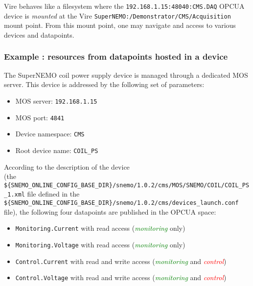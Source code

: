 \noindent Vire      behaves      like      a      filesystem      where      the
\texttt{192.168.1.15:48040:CMS.DAQ}  OPCUA device  is \emph{mounted}
at the Vire  \verb|SuperNEMO:/Demonstrator/CMS/Acquisition| mount point. From
this mount point,  one may navigate and access to  various devices and
datapoints.


\subsubsection{Example : resources from datapoints hosted in a device}

\noindent The  SuperNEMO coil power  supply  device  is managed  through  a dedicated  MOS
server. This device is addressed by the following set of parameters:

\begin{itemize}
\item MOS server: \texttt{192.168.1.15}
\item MOS port: \texttt{4841}
\item Device namespace: \texttt{CMS}
\item Root device name: \texttt{COIL\_PS}
\end{itemize}

\noindent According    to     the    description    of    the     device  \\
  (the \verb|${SNEMO_ONLINE_CONFIG_BASE_DIR}/snemo/1.0.2/cms/MOS/SNEMO/COIL/COIL_PS_1.xml|     file    defined     in    the
\verb|${SNEMO_ONLINE_CONFIG_BASE_DIR}/snemo/1.0.2/cms/devices_launch.conf|  file), the  following four  datapoints are
published in the OPCUA space:

\begin{itemize}
\item      \texttt{Monitoring.Current}      with      read      access
  (\textcolor{green}{\emph{monitoring}} only)
\item      \texttt{Monitoring.Voltage}      with      read      access
  (\textcolor{green}{\emph{monitoring}} only)
\item   \texttt{Control.Current}   with    read   and   write   access
  (\textcolor{green}{\emph{monitoring}}                            and
  \textcolor{red}{\emph{control}})
\item   \texttt{Control.Voltage}   with    read   and   write   access
  (\textcolor{green}{\emph{monitoring}}                            and
  \textcolor{red}{\emph{control}})
\end{itemize}


